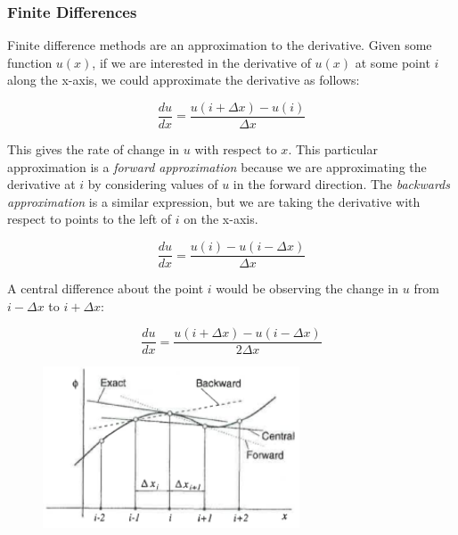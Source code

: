 \documentclass[twocolumn,12pth]{article}
\begin{document}
\subsubsection{Finite Differences}

Finite difference methods are an approximation to the derivative.
Given some function $u(x)$, if we are interested in the derivative of $u(x)$ at some point $i$ along the x-axis, we could approximate the derivative as follows:

\begin{equation}
\frac{du}{dx} = \frac{u(i + \Delta{x}) - u(i)}{\Delta{x}}
\label{eq:FD}
\end{equation}

This gives the rate of change in $u$ with respect to $x$.
This particular approximation is a \textit{forward approximation} because we are approximating the derivative at $i$ by considering values of $u$ in the forward direction.
The \textit{backwards approximation} is a similar expression, but we are taking the derivative with respect to points to the left of $i$ on the x-axis.

\begin{equation}
\frac{du}{dx} = \frac{u(i) - u(i - \Delta{x})}{\Delta{x}}
\label{eq:BD}
\end{equation}

A central difference about the point $i$ would be observing the change in $u$ from $i - \Delta{x}$ to $i + \Delta{x}$:

\begin{equation}
\frac{du}{dx} = \frac{u(i + \Delta{x}) - u(i - \Delta{x})}{2\Delta{x}}
\label{eq:CD}
\end{equation}

\begin{figure}
\centering
\includegraphics[width=3.0in]{finiteDif.png}
\label{fig:difs}
\end{figure}
\end{document}
